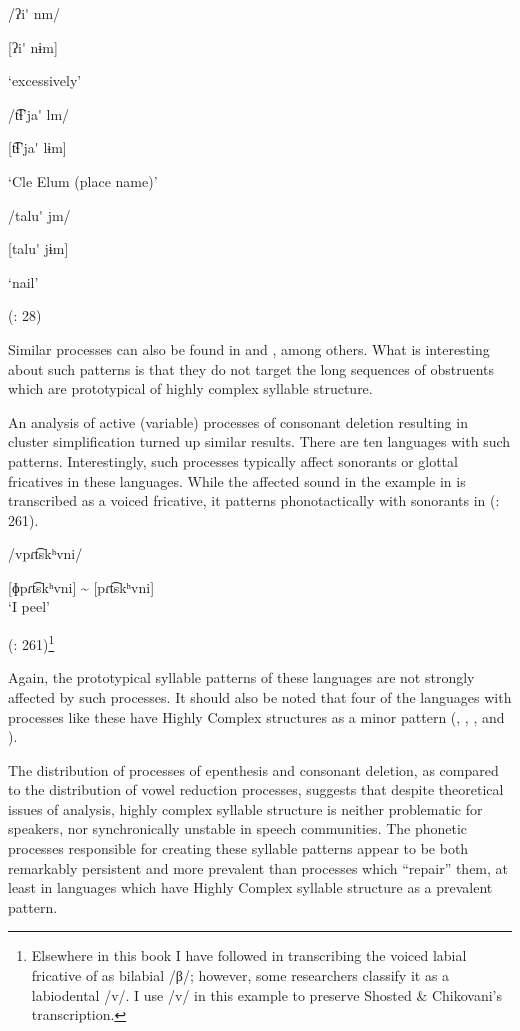 \ea\label{ex:8.7}

\ea  /ʔi\'{} nm/

  [ʔi\'{} nɨm]

  ‘excessively’

\ex  /t͡ɬ’ja\'{} lm/

  [t͡ɬ’ja\'{} lɨm]

  ‘Cle Elum (place name)’

\ex  /talu\'{} jm/

  [talu\'{} jɨm]

  ‘nail’

(\citealt{HargusBeavert2006}: 28)
\z
\z

Similar processes can also be found in  and , among others. What is interesting about such patterns is that they do not target the long sequences of obstruents which are prototypical of highly complex syllable structure.

  An analysis of active (variable) processes of consonant deletion resulting in cluster simplification turned up similar results. There are ten languages with such patterns. Interestingly, such processes typically affect sonorants or glottal fricatives in these languages. While the affected sound in the example in  is transcribed as a voiced fricative, it patterns phonotactically with sonorants in  (\citealt{ShostedChikovani2006}: 261).

\ea\label{ex:8.8}

/vpɾt͡skʰvni/

[ɸpɾt͡skʰvni] {\textasciitilde} [pɾt͡skʰvni]\\
\glt ‘I peel’

(\citealt{ShostedChikovani2006}: 261)\footnote{{Elsewhere in this book I have followed \citet{Aronson1991} in transcribing the voiced labial fricative of  as bilabial /β/; however, some researchers classify it as a labiodental /v/. I use /v/ in this example to preserve Shosted \& Chikovani’s transcription.}}
\z

Again, the prototypical syllable patterns of these languages are not strongly affected by such processes. It should also be noted that four of the languages with processes like these have Highly Complex structures as a minor pattern (, , , and ).

  The distribution of processes of epenthesis and consonant deletion, as compared to the distribution of vowel reduction processes, suggests that despite theoretical issues of analysis, highly complex syllable structure is neither problematic for speakers, nor synchronically unstable in speech communities. The phonetic processes responsible for creating these syllable patterns appear to be both remarkably persistent and more prevalent than processes which ``repair'' them, at least in languages which have Highly Complex syllable structure as a prevalent pattern.

